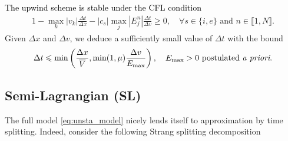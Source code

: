 \documentclass{article}
\numberwithin{equation}{section}
\newcommand{\todo}[1]{{\color{red}\textbf{#1}}}
\begin{document}
\noindent \textcolor{black}{The upwind scheme is stable under the CFL condition} %
\begin{align*}
	1 - \max_{k} |v_k| \frac{\Delta t}{\Delta x} - |c_s| \max_{j} |E^n_j| \frac{\Delta t}{\Delta v} \geqslant 0, \quad \forall s \in \{i,e\}\text{ and } n \in \llbracket1,N\rrbracket.
\end{align*}
Given $\Delta x$ and $\Delta v$, we deduce a sufficiently small value of $\Delta t$ with the bound
\begin{align}
	\Delta t \leqslant \min\left(\frac{\Delta x}{\overline{V}}, \min(1,\mu)\frac{\Delta v}{E_{\text{max}}}\right), \quad E_{\text{max}}>0 \text{ postulated \emph{a priori}.}
	\label{eq:CFL}
\end{align}

\subsection{Semi-Lagrangian (SL)}\label{ssec:SLscheme}

The full model \cref{eq:unsta_model} nicely lends itself to approximation by time splitting. Indeed, consider the following Strang splitting decomposition 


%
%
\end{document}
